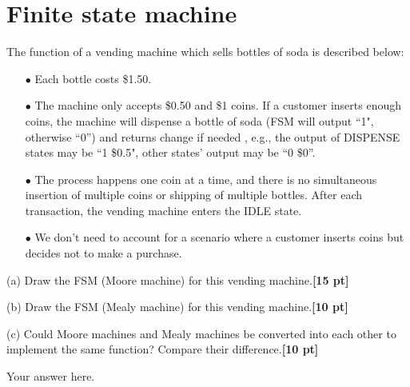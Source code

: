 \documentclass[a4paper]{article}
\begin{document}
\newpage
\section{Finite state machine}

The function of a vending machine which sells bottles of soda is described below:

\begin{itemize}
\item[$\bullet$] Each bottle costs \$1.50. 
\item[$\bullet$] The machine only accepts \$0.50 and \$1 coins. If a customer inserts enough coins, the machine will dispense a bottle of soda (FSM will output ``1", otherwise ``0'') and returns change if needed , e.g., the output of DISPENSE states may be ``1 \$0.5", other states' output may be ``0 \$0''.
\item[$\bullet$] The process happens one coin at a time, and there is no simultaneous insertion of multiple coins or shipping of multiple bottles. After each transaction, the vending machine enters the IDLE state.
\item[$\bullet$] We don’t need to account for a scenario where a customer inserts coins but decides not to make a purchase.
\end{itemize}


(a) Draw the FSM (Moore machine) for this vending machine.\textbf{[15 pt]}

(b) Draw the FSM (Mealy machine) for this vending machine.\textbf{[10 pt]}

(c) Could Moore machines and Mealy machines be converted into each other to implement the same function? Compare their difference.\textbf{[10 pt]}
\begin{answer}[Question 3]
        Your answer here.
\end{answer}
\end{document}
